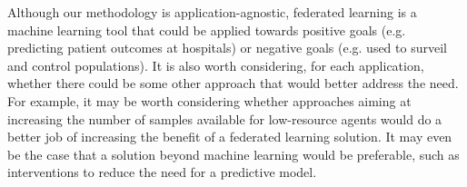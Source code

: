\documentclass{article}
\begin{document}
Although our methodology is application-agnostic, federated learning is a machine learning tool that could be applied towards positive goals (e.g. predicting patient outcomes at hospitals) or negative goals (e.g. used to surveil and control populations). It is also worth considering, for each application, whether there could be some other approach that would better address the need. For example, it may be worth considering whether approaches aiming at increasing the number of samples available for low-resource agents would do a better job of increasing the benefit of a federated learning solution. It may even be the case that a solution beyond machine learning would be preferable, such as interventions to reduce the need for a predictive model. 



\end{document}
